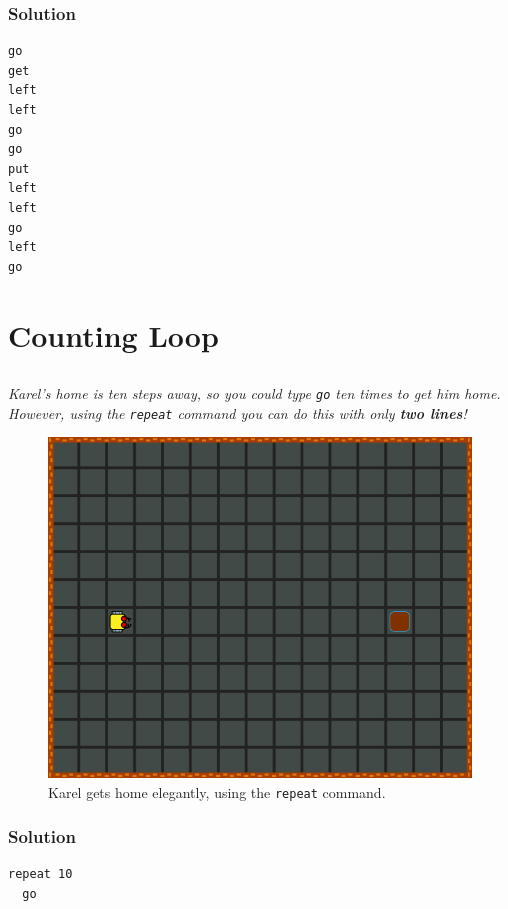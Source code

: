 \documentclass[article,A4,12pt]{llncs}
\begin{document}
{{\subsubsection{Solution}
\begin{verbatim}
go
get
left
left
go
go
put
left
left
go
left 
go
\end{verbatim}



\newpage
\setcounter{section}{5}
\section{Counting Loop}

\subsection{}

{\em Karel's home is ten steps away, so you could type {\tt go} ten times to get him home. However, using the {\tt repeat} command you can do this with only {\bf two lines}! 

\begin{figure}[!ht]
\begin{center}
\includegraphics[height=0.4\textwidth]{imgk/c01.png}
\end{center}
\vspace{-4mm}
\caption{Karel gets home elegantly, using the {\tt repeat} command.}
\label{fig:c01}
\vspace{-4mm}
\end{figure}
\noindent

\subsubsection{Solution}
\begin{verbatim}
repeat 10
  go
\end{verbatim}

\newpage
\subsection{}

}}}
\end{document}
